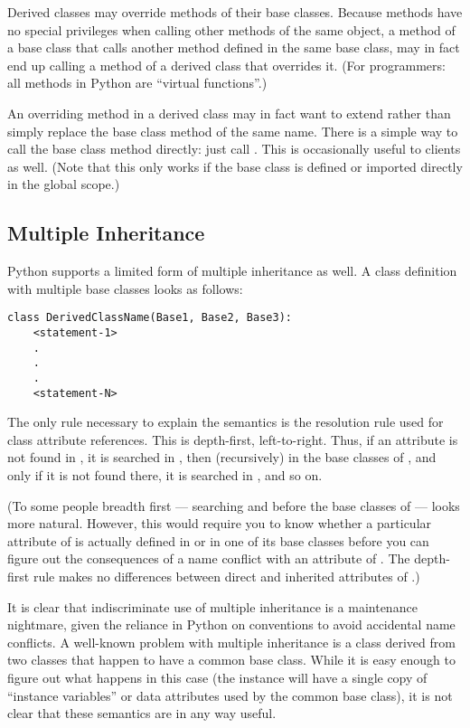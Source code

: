 \documentclass{manual}
\begin{document}
Derived classes may override methods of their base classes.  Because
methods have no special privileges when calling other methods of the
same object, a method of a base class that calls another method
defined in the same base class, may in fact end up calling a method of
a derived class that overrides it.  (For \Cpp{} programmers: all methods
in Python are ``virtual functions''.)

An overriding method in a derived class may in fact want to extend
rather than simply replace the base class method of the same name.
There is a simple way to call the base class method directly: just
call .  This is
occasionally useful to clients as well.  (Note that this only works if
the base class is defined or imported directly in the global scope.)


\subsection{Multiple Inheritance}
\label{multiple}

Python supports a limited form of multiple inheritance as well.  A
class definition with multiple base classes looks as follows:

\begin{verbatim}
class DerivedClassName(Base1, Base2, Base3):
    <statement-1>
    .
    .
    .
    <statement-N>
\end{verbatim}

The only rule necessary to explain the semantics is the resolution
rule used for class attribute references.  This is depth-first,
left-to-right.  Thus, if an attribute is not found in
, it is searched in , then
(recursively) in the base classes of , and only if it is
not found there, it is searched in , and so on.

(To some people breadth first --- searching  and
 before the base classes of  --- looks more
natural.  However, this would require you to know whether a particular
attribute of  is actually defined in  or in
one of its base classes before you can figure out the consequences of
a name conflict with an attribute of .  The depth-first
rule makes no differences between direct and inherited attributes of
.)

It is clear that indiscriminate use of multiple inheritance is a
maintenance nightmare, given the reliance in Python on conventions to
avoid accidental name conflicts.  A well-known problem with multiple
inheritance is a class derived from two classes that happen to have a
common base class.  While it is easy enough to figure out what happens
in this case (the instance will have a single copy of ``instance
variables'' or data attributes used by the common base class), it is
not clear that these semantics are in any way useful.
\end{document}
